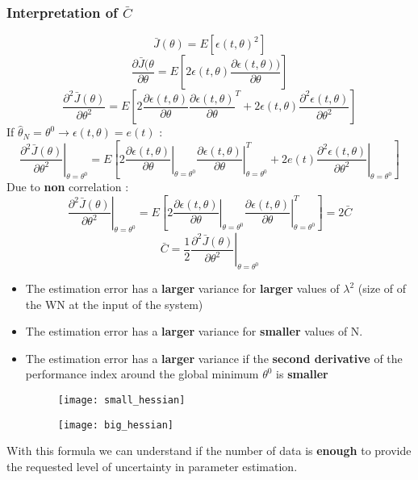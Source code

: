 \subsubsection{Interpretation of $\bar{C}$}
$$\bar{J}(\theta) = E[\epsilon(t,\theta)^2]$$
$$ \frac{\partial{\bar{J}(\theta}}{\partial{\theta}}=E \left[ 2\epsilon(t,\theta)\frac{\partial{\epsilon(t,\theta)})}{\partial{\theta}}\right] $$
$$ \frac{\partial^2{\bar{J}(\theta)}}{\partial{\theta^2}}=E \left[ 2\frac{\partial{\epsilon(t,\theta)}}{\partial{\theta}}\frac{\partial{\epsilon(t,\theta)}}{\partial{\theta}}^T + 2\epsilon(t,\theta)\frac{\partial^2{\epsilon(t,\theta)}}{\partial{\theta^2}}\right] $$
If $\hat{\theta}_N = \theta ^0 \to \epsilon(t,\theta) = e(t)$ :
$$ \left. \frac{\partial^2{\bar{J}(\theta)}}{\partial{\theta^2}} \right|_{\theta=\theta^0}=E \left[ \left. 2\frac{\partial{\epsilon(t,\theta)}}{\partial{\theta}}\right|_{\theta=\theta^0} \left. \frac{\partial{\epsilon(t,\theta)}}{\partial{\theta}}\right|^{T}_{\theta=\theta^0} + \left. 2e(t)\frac{\partial^2{\epsilon(t,\theta)}}{\partial{\theta^2}}\right|_{\theta=\theta^0} \right] $$
Due to \textbf{non} correlation :
$$ \left. \frac{\partial^2{\bar{J}(\theta)}}{\partial{\theta^2}} \right|_{\theta=\theta^0}=E \left[ \left. 2\frac{\partial{\epsilon(t,\theta)}}{\partial{\theta}}\right|_{\theta=\theta^0} \left. \frac{\partial{\epsilon(t,\theta)}}{\partial{\theta}}\right|^{T}_{\theta=\theta^0} \right] =2\bar{C} $$
\[
\boxed{\bar{C} = \frac{1}{2}\left. \frac{\partial^2{\bar{J}(\theta)}}{\partial{\theta^2}} \right|_{\theta=\theta^0}}
\]
\begin{itemize}
\item The estimation error has a \textbf{larger} variance for \textbf{larger} values of $\lambda^2$ (size of of the WN at the input of the system)
\item The estimation error has a \textbf{larger} variance for \textbf{smaller} values of N.
\item The estimation error  has a \textbf{larger } variance if the \textbf{second derivative} of the performance index around the global minimum $\theta^0$ is \textbf{smaller}
\begin{figure}[!h]
\begin{minipage}{.5\textwidth}
 \centering
  \texttt{[image: small\_hessian]}
\end{minipage}%
	\begin{minipage}{.5\textwidth}
  \centering
  \texttt{[image: big\_hessian]}
\end{minipage}%
\end{figure}
\end{itemize}
With this formula we can understand if the number of data is \textbf{enough} to provide the requested level of uncertainty in parameter estimation.